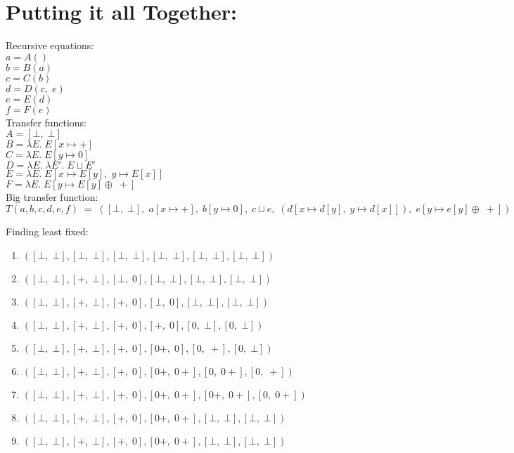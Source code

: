 \documentclass{article}
\begin{document}


\section*{Putting it all Together:}
Recursive equations:\\
$a = A()	$\\
$b = B(a) 	$\\
$c = C(b)	$\\
$d = D(c,\;e) $\\
$e = E(d)	$\\
$f = F(e)	$\\

\noindent Transfer functions:\\
$A = [\bot,\;\bot] $\\
$B = \lambda E.\;E[x \mapsto +]$\\
$C = \lambda E.\;E[y \mapsto 0]$\\
$D = \lambda E.\;\lambda E'.\;E\sqcup E'$\\
$E = \lambda E.\;E[x \mapsto E[y],\;y\mapsto E[x]]$\\
$F = \lambda E.\;E[y \mapsto E[y] \oplus\;+]$\\

\noindent Big transfer function:
$$T(a ,b ,c, d, e, f)\;=\;([\bot,\;\bot],\;a[x\mapsto+],\;b[y\mapsto 0],\;c\sqcup e,\;(d[x \mapsto d[y],\;y\mapsto d[x]]),\;e[y \mapsto e[y] \oplus\;+])$$

\noindent Finding least fixed:
\begin{enumerate}
	\item $([\bot,\;\bot],	[\bot,\;\bot], 	[\bot,\;\bot], 	[\bot,\;\bot], 	[\bot,\;\bot], 	[\bot,\;\bot])$
	\item $([\bot,\;\bot], 	[+,\;\bot], 	[\bot,\;0], 	[\bot,\;\bot],  [\bot,\;\bot],  [\bot,\;\bot])$
	\item $([\bot,\;\bot], 	[+,\;\bot], 	[+,\;0], 	[\bot,\;0], 	[\bot,\;\bot], 	[\bot,\;\bot])$
	\item $([\bot,\;\bot], 	[+,\;\bot], 	[+,\;0], 	[+,\;0], 	[0,\;\bot], 	[0,\;\bot])$
	\item $([\bot,\;\bot], 	[+,\;\bot], 	[+,\;0], 	[0+,\;0], 	[0,\;+], 	[0,\;\bot])$
	\item $([\bot,\;\bot], 	[+,\;\bot], 	[+,\;0], 	[0+,\;0+], 	[0,\;0+], 	[0,\;+])$

	\item $([\bot,\;\bot], 	[+,\;\bot], 	[+,\;0], 	[0+,\;0+], 	[0+,\;0+], 	[0,\;0+])$

	\item $([\bot,\;\bot], 	[+,\;\bot], 	[+,\;0], 	[0+,\;0+], 	[\bot,\;\bot], 	[\bot,\;\bot])$

	\item $([\bot,\;\bot], 	[+,\;\bot], 	[+,\;0], 	[0+,\;0+], 	[\bot,\;\bot], 	[\bot,\;\bot])$
\end{enumerate}
\end{document}
